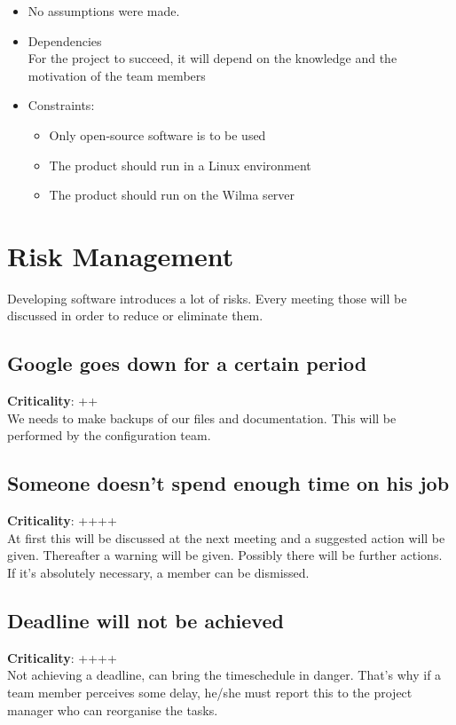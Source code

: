 \documentclass[a4paper, 12pt]{report}
\begin{document}
			\begin{itemize}
				
				\item No assumptions were made.
				
				\item Dependencies \\
 					  For the project to succeed, it will depend on
					  the knowledge and the motivation of the team members	
				
				\item Constraints:
				\begin{itemize}
					\item Only open-source software is to be used
					\item The product should run in a Linux environment
					\item The product should run on the Wilma server
				\end{itemize}
				
			\end{itemize}	
			
		\section{Risk Management}
			
			Developing software introduces a lot of risks. Every meeting those will
			be discussed in order to reduce or eliminate them. 
			
			\subsection{Google goes down for a certain period}
			\textbf{Criticality}: ++ \\
			We needs to make backups of our files and documentation. This will be 
			performed by the configuration team.
			
			\subsection{Someone doesn't spend enough time on his job}
			\textbf{Criticality}: ++++ \\
			At first this will be discussed at the next meeting and a suggested action 
			will be given. Thereafter a warning will be given. Possibly there will be 
			further actions. If it’s absolutely necessary, a member can be dismissed.
			
			\subsection{Deadline will not be achieved}
			\textbf{Criticality}: ++++ \\
			Not achieving a deadline, can bring the timeschedule in danger. That's why
			if a team member perceives some delay, he/she must report this to the project manager
			who can reorganise the tasks.  
			
\end{document}
